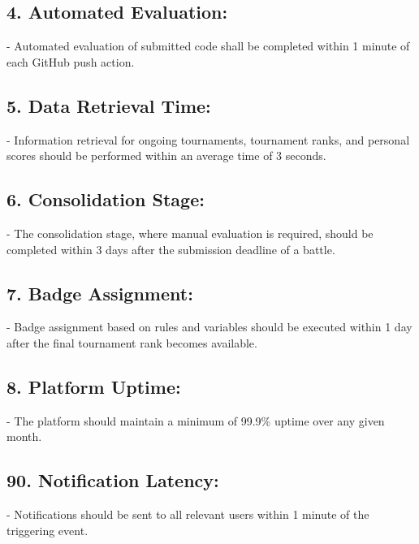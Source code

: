 \subsection*{4. Automated Evaluation:}
   - Automated evaluation of submitted code shall be completed within 1 minute of each GitHub push action.


\subsection*{5. Data Retrieval Time:}
   - Information retrieval for ongoing tournaments, tournament ranks, and personal scores should be performed within an average time of 3 seconds.

\subsection*{6. Consolidation Stage:}
   - The consolidation stage, where manual evaluation is required, should be completed within 3 days after the submission deadline of a battle.

\subsection*{7. Badge Assignment:}
   - Badge assignment based on rules and variables should be executed within 1 day after the final tournament rank becomes available.

\subsection*{8. Platform Uptime:}
   - The platform should maintain a minimum of 99.9\% uptime over any given month.

\subsection*{90. Notification Latency:}
    - Notifications should be sent to all relevant users within 1 minute of the triggering event.

